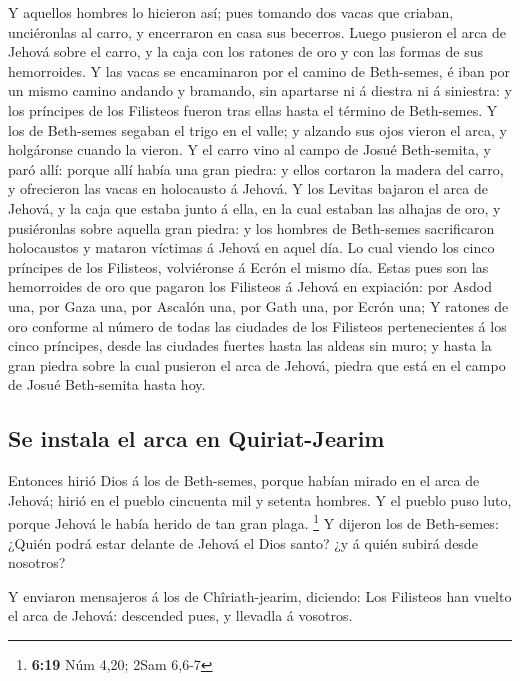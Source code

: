  Y aquellos hombres lo hicieron así; pues tomando dos vacas
que criaban, unciéronlas al carro, y encerraron en casa sus becerros.
 Luego pusieron el arca de Jehová sobre el carro, y la caja
con los ratones de oro y con las formas de sus hemorroides.
 Y las vacas se encaminaron por el camino de Beth-semes, é
iban por un mismo camino andando y bramando, sin apartarse ni á diestra
ni á siniestra: y los príncipes de los Filisteos fueron tras ellas hasta
el término de Beth-semes.  Y los de Beth-semes segaban el
trigo en el valle; y alzando sus ojos vieron el arca, y holgáronse
cuando la vieron.  Y el carro vino al campo de Josué
Beth-semita, y paró allí: porque allí había una gran piedra: y ellos
cortaron la madera del carro, y ofrecieron las vacas en holocausto á
Jehová.  Y los Levitas bajaron el arca de Jehová, y la caja
que estaba junto á ella, en la cual estaban las alhajas de oro, y
pusiéronlas sobre aquella gran piedra: y los hombres de Beth-semes
sacrificaron holocaustos y mataron víctimas á Jehová en aquel día.
 Lo cual viendo los cinco príncipes de los Filisteos,
volviéronse á Ecrón el mismo día.  Estas pues son las
hemorroides de oro que pagaron los Filisteos á Jehová en expiación: por
Asdod una, por Gaza una, por Ascalón una, por Gath una, por Ecrón una;
 Y ratones de oro conforme al número de todas las ciudades
de los Filisteos pertenecientes á los cinco príncipes, desde las
ciudades fuertes hasta las aldeas sin muro; y hasta la gran piedra sobre
la cual pusieron el arca de Jehová, piedra que está en el campo de Josué
Beth-semita hasta hoy.

\hypertarget{se-instala-el-arca-en-quiriat-jearim}{%
\subsection{Se instala el arca en
Quiriat-Jearim}\label{se-instala-el-arca-en-quiriat-jearim}}

 Entonces hirió Dios á los de Beth-semes, porque habían
mirado en el arca de Jehová; hirió en el pueblo cincuenta mil y setenta
hombres. Y el pueblo puso luto, porque Jehová le había herido de tan
gran plaga. \footnote{\textbf{6:19} Núm 4,20; 2Sam 6,6-7} 
Y dijeron los de Beth-semes: ¿Quién podrá estar delante de Jehová el
Dios santo? ¿y á quién subirá desde nosotros?

 Y enviaron mensajeros á los de Chîriath-jearim, diciendo:
Los Filisteos han vuelto el arca de Jehová: descended pues, y llevadla á
vosotros.

